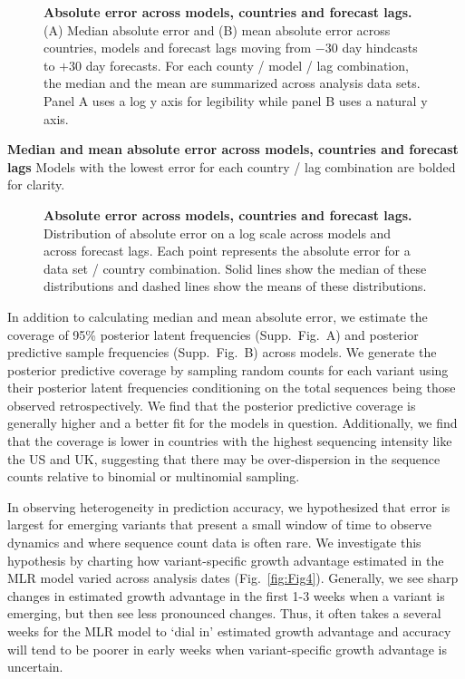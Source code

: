 \documentclass[10pt,letterpaper]{article}
\begin{document}
\begin{figure}[h!]
	\centering
	\caption{\textbf{Absolute error across models, countries and forecast lags.}
	(A) Median absolute error and (B) mean absolute error across countries, models and forecast lags moving from $-30$ day hindcasts to $+30$ day forecasts.
	For each county / model / lag combination, the median and the mean are summarized across analysis data sets.
	Panel A uses a log y axis for legibility while panel B uses a natural y axis.
	}
	\label{fig:Fig2}
\end{figure}

\begin{table}[h!]
	\centering
	\caption{
		\textbf{Median and mean absolute error across models, countries and forecast lags}
		Models with the lowest error for each country / lag combination are bolded for clarity.
	}
	\label{table:Table1}
\end{table}

\begin{figure}[tb!]
	\centering
	\caption{\textbf{Absolute error across models, countries and forecast lags.}
	Distribution of absolute error on a log scale across models and across forecast lags.
	Each point represents the absolute error for a data set / country combination.
	Solid lines show the median of these distributions and dashed lines show the means of these distributions.
	}
	\label{fig:Fig3}
\end{figure}

In addition to calculating median and mean absolute error, we estimate the coverage of 95\% posterior latent frequencies (Supp.\ Fig.\ A) and posterior predictive sample frequencies (Supp.\ Fig.\ B) across models.
We generate the posterior predictive coverage by sampling random counts for each variant using their posterior latent frequencies conditioning on the total sequences being those observed retrospectively.
We find that the posterior predictive coverage is generally higher and a better fit for the models in question.
Additionally, we find that the coverage is lower in countries with the highest sequencing intensity like the US and UK, suggesting that there may be over-dispersion in the sequence counts relative to binomial or multinomial sampling.

In observing heterogeneity in prediction accuracy, we hypothesized that error is largest for emerging variants that present a small window of time to observe dynamics and where sequence count data is often rare.
We investigate this hypothesis by charting how variant-specific growth advantage estimated in the MLR model varied across analysis dates (Fig.~\ref{fig:Fig4}).
Generally, we see sharp changes in estimated growth advantage in the first 1-3 weeks when a variant is emerging, but then see less pronounced changes.
Thus, it often takes a several weeks for the MLR model to `dial in' estimated growth advantage and accuracy will tend to be poorer in early weeks when variant-specific growth advantage is uncertain.
\end{document}
